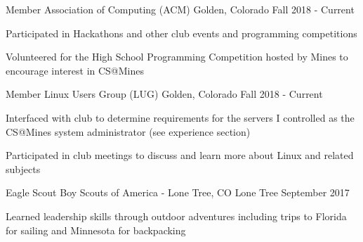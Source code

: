 \begin{cventries}



    \cventry
    {Member}
    {Association of Computing (ACM)}
    {Golden, Colorado}
    {Fall 2018 - Current}
    {
      \begin{cvitems}
        \item Participated in Hackathons and other club events and programming competitions
        \item Volunteered for the High School Programming Competition hosted by Mines to encourage interest in CS@Mines
      \end{cvitems}
    }
    {}

    \cventry
    {Member}
    {Linux Users Group (LUG)}
    {Golden, Colorado}
    {Fall 2018 - Current}
    {
      \begin{cvitems}
        \item Interfaced with club to determine requirements for the servers I controlled as the CS@Mines system administrator (see experience section)
        \item {Participated in club meetings to discuss and learn more about Linux and related subjects}
      \end{cvitems}
    }
    {}

    \cventry
    {Eagle Scout} %
    {Boy Scouts of America - Lone Tree, CO} %
    {Lone Tree} %
    {September 2017} %
    {
      \begin{cvitems} %
        \item {Learned leadership skills through outdoor adventures
            including trips to Florida for sailing and Minnesota for
            backpacking}
      \end{cvitems}
    }
    {}
    \fi

\end{cventries}
